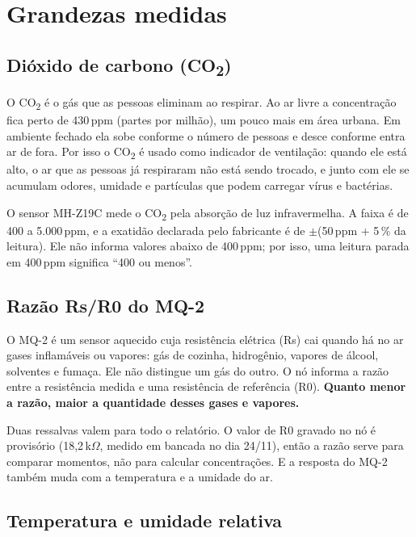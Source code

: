 \documentclass[11pt,a4paper]{article}
\newcommand{\cod}{CO\textsubscript{2}}
\begin{document}
\section{Grandezas medidas}

\subsection{Dióxido de carbono (\texorpdfstring{\cod}{CO2})}

O \cod{} é o gás que as pessoas eliminam ao respirar. Ao ar livre a concentração fica perto de 430\,ppm (partes por milhão), um pouco mais em área urbana. Em ambiente fechado ela sobe conforme o número de pessoas e desce conforme entra ar de fora. Por isso o \cod{} é usado como indicador de ventilação: quando ele está alto, o ar que as pessoas já respiraram não está sendo trocado, e junto com ele se acumulam odores, umidade e partículas que podem carregar vírus e bactérias.

O sensor MH-Z19C mede o \cod{} pela absorção de luz infravermelha. A faixa é de 400 a 5.000\,ppm, e a exatidão declarada pelo fabricante é de $\pm$(50\,ppm + 5\,\% da leitura). Ele não informa valores abaixo de 400\,ppm; por isso, uma leitura parada em 400\,ppm significa ``400 ou menos''.

\subsection{Razão Rs/R0 do MQ-2}

O MQ-2 é um sensor aquecido cuja resistência elétrica (Rs) cai quando há no ar gases inflamáveis ou vapores: gás de cozinha, hidrogênio, vapores de álcool, solventes e fumaça. Ele não distingue um gás do outro. O nó informa a razão entre a resistência medida e uma resistência de referência (R0). \textbf{Quanto menor a razão, maior a quantidade desses gases e vapores.}

Duas ressalvas valem para todo o relatório. O valor de R0 gravado no nó é provisório (18,2\,k$\Omega$, medido em bancada no dia 24/11), então a razão serve para comparar momentos, não para calcular concentrações. E a resposta do MQ-2 também muda com a temperatura e a umidade do ar.

\subsection{Temperatura e umidade relativa}
\end{document}
